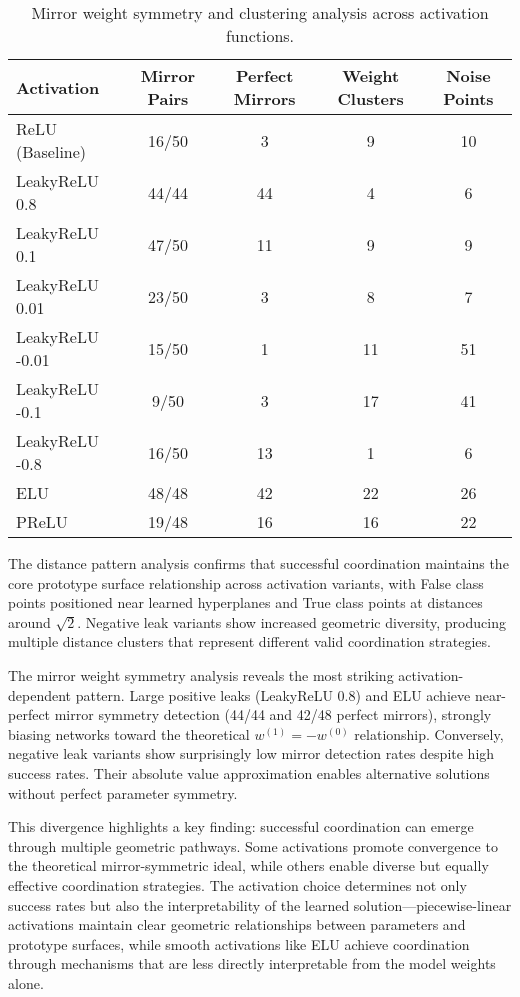 \begin{table}[ht]
\centering
\caption{Mirror weight symmetry and clustering analysis across activation functions.}
\label{tab:relu1-activation-symmetry}
\begin{tabular}{lcccc}
\toprule
Activation & Mirror Pairs & Perfect Mirrors & Weight Clusters & Noise Points \\
\midrule
ReLU (Baseline) & 16/50 & 3 & 9 & 10 \\
LeakyReLU 0.8 & 44/44 & 44 & 4 & 6 \\
LeakyReLU 0.1 & 47/50 & 11 & 9 & 9 \\
LeakyReLU 0.01 & 23/50 & 3 & 8 & 7 \\
LeakyReLU -0.01 & 15/50 & 1 & 11 & 51 \\
LeakyReLU -0.1 & 9/50 & 3 & 17 & 41 \\
LeakyReLU -0.8 & 16/50 & 13 & 1 & 6 \\
ELU & 48/48 & 42 & 22 & 26 \\
PReLU & 19/48 & 16 & 16 & 22 \\
\bottomrule
\end{tabular}
\end{table}

The distance pattern analysis confirms that successful coordination maintains the core prototype surface relationship across activation variants, with False class points positioned near learned hyperplanes and True class points at distances around $\sqrt{2}$. Negative leak variants show increased geometric diversity, producing multiple distance clusters that represent different valid coordination strategies.

The mirror weight symmetry analysis reveals the most striking activation-dependent pattern. Large positive leaks (LeakyReLU 0.8) and ELU achieve near-perfect mirror symmetry detection (44/44 and 42/48 perfect mirrors), strongly biasing networks toward the theoretical $w^{(1)} = -w^{(0)}$ relationship. Conversely, negative leak variants show surprisingly low mirror detection rates despite high success rates. Their absolute value approximation enables alternative solutions without perfect parameter symmetry.

This divergence highlights a key finding: successful coordination can emerge through multiple geometric pathways. Some activations promote convergence to the theoretical mirror-symmetric ideal, while others enable diverse but equally effective coordination strategies. The activation choice determines not only success rates but also the interpretability of the learned solution—piecewise-linear activations maintain clear geometric relationships between parameters and prototype surfaces, while smooth activations like ELU achieve coordination through mechanisms that are less directly interpretable from the model weights alone.

